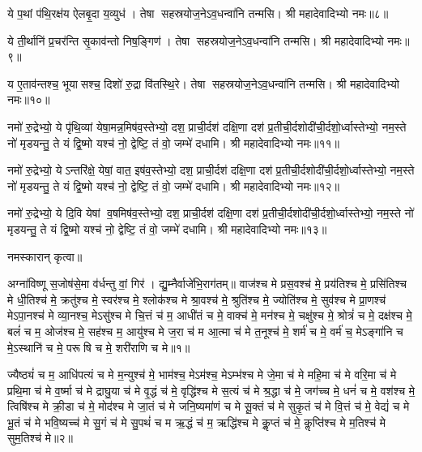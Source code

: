 ये प॒थां प॑थि॒रक्ष॑य ऐलबृ॒दा य॒व्युध॑। तेषा सहस्रयोज॒ने\-ऽव॒धन्वा॑नि तन्मसि। श्री महादेवादिभ्यो नमः॥८॥

ये ती॒र्थानि॑ प्र॒चर॑न्ति सृ॒काव॑न्तो निष॒ङ्गिण॑। तेषा सहस्रयोज॒ने\-ऽव॒धन्वा॑नि तन्मसि। श्री महादेवादिभ्यो नमः॥९॥

य ए॒ताव॑न्तश्च॒ भूयासश्च॒ दिशो॑ रु॒द्रा वि॑तस्थि॒रे। तेषा सहस्रयोज॒ने\-ऽव॒धन्वा॑नि तन्मसि। श्री महादेवादिभ्यो नमः॥१०॥

नमो॑ रु॒द्रेभ्यो॒ ये पृ॑थि॒व्यां येषा॒मन्न॒मिष॑व॒स्तेभ्यो॒ दश॒ प्राची॒र्दश॑ दक्षि॒णा दश॑ प्र॒तीची॒र्दशो\-दी॑ची॒र्दशो॒र्ध्वास्तेभ्यो॒ नम॒स्ते नो॑ मृडयन्तु॒ ते यं द्वि॒ष्मो यश्च॑ नो॒ द्वेष्टि॒ तं वो॒ जम्भे॑ दधामि। श्री महादेवादिभ्यो नमः॥११॥ 

नमो॑ रु॒द्रेभ्यो॒ येऽन्तरि॑क्षे॒ येषां॒ वात॒ इष॑व॒स्तेभ्यो॒ दश॒ प्राची॒र्दश॑ दक्षि॒णा दश॑ प्र॒तीची॒र्दशो\-दी॑ची॒र्दशो॒र्ध्वास्तेभ्यो॒ नम॒स्ते नो॑ मृडयन्तु॒ ते यं द्वि॒ष्मो यश्च॑ नो॒ द्वेष्टि॒ तं वो॒ जम्भे॑ दधामि। श्री महादेवादिभ्यो नमः॥१२॥ 

नमो॑ रु॒द्रेभ्यो॒ ये दि॒वि येषां व॒\ar षमिष॑व॒स्तेभ्यो॒ दश॒ प्राची॒र्दश॑ दक्षि॒णा दश॑ प्र॒तीची॒र्दशो\-दी॑ची॒र्दशो॒र्ध्वास्तेभ्यो॒ नम॒स्ते नो॑ मृडयन्तु॒ ते यं द्वि॒ष्मो यश्च॑ नो॒ द्वेष्टि॒ तं वो॒ जम्भे॑ दधामि। श्री महादेवादिभ्यो नमः॥१३॥ 

नमस्कारान् कृत्वा॥

{\small \closesection}


अग्ना॑विष्णू स॒जोष॑से॒मा व॑र्धन्तु वां॒ गिर॑। द्यु॒म्नैर्वाजे॑भि॒रा\-ग॑तम्॥ 
वाज॑श्च मे प्रस॒वश्च॑ मे॒ प्रय॑तिश्च मे॒ प्रसि॑तिश्च मे धी॒तिश्च॑ मे॒ क्रतु॑श्च मे॒ स्वर॑श्च मे॒ श्लोक॑श्च मे श्रा॒वश्च॑ मे॒ श्रुति॑श्च मे॒ ज्योति॑श्च मे॒ सुव॑श्च मे प्रा॒णश्च॑ मेऽपा॒नश्च॑ मे व्या॒नश्च॒ मेऽसु॑श्च मे चि॒त्तं च॑ म॒ आधी॑तं च मे॒ वाक्च॑ मे॒ मन॑श्च मे॒ चक्षु॑श्च मे॒ श्रोत्रं॑ च मे॒ दक्ष॑श्च मे॒ बलं॑ च म॒ ओज॑श्च मे॒ सह॑श्च म॒ आयु॑श्च मे ज॒रा च॑ म आ॒त्मा च॑ मे त॒नूश्च॑ मे॒ शर्म॑ च मे॒ वर्म॑ च॒ मेऽङ्गा॑नि च मे॒ऽस्थानि॑ च मे॒ परूषि च मे॒ शरी॑राणि च मे॥१॥ 

ज्यैष्ठ्यं॑ च म॒ आधि॑पत्यं च मे म॒न्युश्च॑ मे॒ भाम॑श्च॒ मेऽम॑श्च॒ मेऽम्भ॑श्च मे जे॒मा च॑ मे महि॒मा च॑ मे वरि॒मा च॑ मे प्रथि॒मा च॑ मे व॒र्ष्मा च॑ मे द्राघु॒या च॑ मे वृ॒द्धं च॑ मे॒ वृद्धि॑श्च मे स॒त्यं च॑ मे श्र॒द्धा च॑ मे॒ जग॑च्च मे॒ धनं॑ च मे॒ वश॑श्च मे॒ त्विषि॑श्च मे क्री॒डा च॑ मे॒ मोद॑श्च मे जा॒तं च॑ मे जनि॒ष्यमा॑णं च मे सू॒क्तं च॑ मे सुकृ॒तं च॑ मे वि॒त्तं च॑ मे॒ वेद्यं॑ च मे भू॒तं च॑ मे भवि॒ष्यच्च॑ मे सु॒गं च॑ मे सु॒पथं॑ च म ऋ॒द्धं च॑ म॒ ऋद्धि॑श्च मे कॢ॒प्तं च॑ मे॒ कॢप्ति॑श्च मे म॒तिश्च॑ मे सुम॒तिश्च॑ मे॥२॥ 


